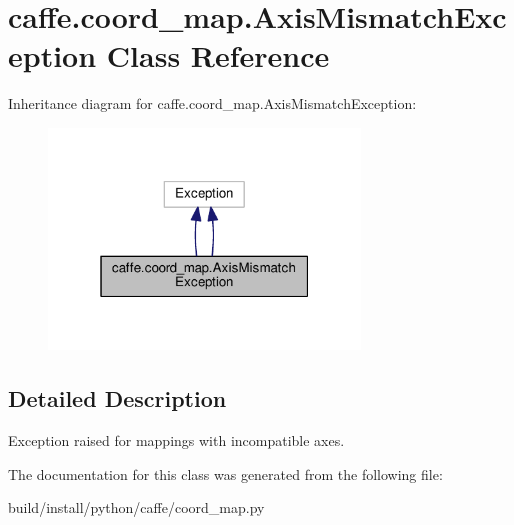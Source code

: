 \hypertarget{classcaffe_1_1coord__map_1_1_axis_mismatch_exception}{}\section{caffe.\+coord\+\_\+map.\+Axis\+Mismatch\+Exception Class Reference}
\label{classcaffe_1_1coord__map_1_1_axis_mismatch_exception}


Inheritance diagram for caffe.\+coord\+\_\+map.\+Axis\+Mismatch\+Exception\+:
\nopagebreak
\begin{figure}[H]
\begin{center}
\leavevmode
\includegraphics[width=235pt]{classcaffe_1_1coord__map_1_1_axis_mismatch_exception__inherit__graph}
\end{center}
\end{figure}


\subsection{Detailed Description}
\begin{DoxyVerb}Exception raised for mappings with incompatible axes.
\end{DoxyVerb}
 

The documentation for this class was generated from the following file\+:\begin{DoxyCompactItemize}
\item 
build/install/python/caffe/coord\+\_\+map.\+py\end{DoxyCompactItemize}
